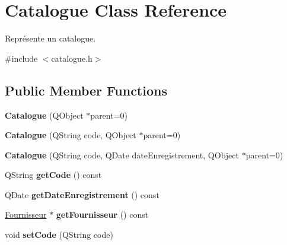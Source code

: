 \hypertarget{class_catalogue}{
\section{Catalogue Class Reference}
\label{class_catalogue}
}


Représente un catalogue.  




{\ttfamily \#include $<$catalogue.h$>$}

\subsection*{Public Member Functions}
\begin{DoxyCompactItemize}
\item 
\hypertarget{class_catalogue_a099665eeee3b1f0c80a929d2a85cf3f2}{
{\bfseries Catalogue} (QObject $\ast$parent=0)}
\label{class_catalogue_a099665eeee3b1f0c80a929d2a85cf3f2}

\item 
\hypertarget{class_catalogue_ac98ee6330c7b84635e9c308f3a6118ae}{
{\bfseries Catalogue} (QString code, QObject $\ast$parent=0)}
\label{class_catalogue_ac98ee6330c7b84635e9c308f3a6118ae}

\item 
\hypertarget{class_catalogue_acc8d324b1298f205e14f7dd7b337221b}{
{\bfseries Catalogue} (QString code, QDate dateEnregistrement, QObject $\ast$parent=0)}
\label{class_catalogue_acc8d324b1298f205e14f7dd7b337221b}

\item 
\hypertarget{class_catalogue_ae815e3fcfb3a6a4ea9e64b101e69dded}{
QString {\bfseries getCode} () const }
\label{class_catalogue_ae815e3fcfb3a6a4ea9e64b101e69dded}

\item 
\hypertarget{class_catalogue_ac9a9fc872e3ac85de35a053ec10e5cee}{
QDate {\bfseries getDateEnregistrement} () const }
\label{class_catalogue_ac9a9fc872e3ac85de35a053ec10e5cee}

\item 
\hypertarget{class_catalogue_a8c16aa5c87524a2b34c54345a91e45e6}{
\hyperlink{class_fournisseur}{Fournisseur} $\ast$ {\bfseries getFournisseur} () const }
\label{class_catalogue_a8c16aa5c87524a2b34c54345a91e45e6}

\item 
\hypertarget{class_catalogue_aa39c0a0dcd5d11461a5c95a41e4e74dd}{
void {\bfseries setCode} (QString code)}
\label{class_catalogue_aa39c0a0dcd5d11461a5c95a41e4e74dd}


\end{DoxyCompactItemize}
